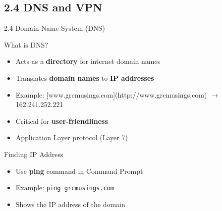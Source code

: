 \documentclass{beamer}
\begin{document}
	\subsection{2.4 DNS and VPN}
	\begin{frame}{2.4 Domain Name System (DNS)}
		\begin{block}{What is DNS?}
			\begin{itemize}
				\item Acts as a \textbf{directory} for internet domain names
				\item Translates \textbf{domain names} to \textbf{IP addresses}
				\item Example: [www.grcmusings.com](http://www.grcmusings.com) $\to$ 162.241.252.221
				\item Critical for \textbf{user-friendliness}
				\item Application Layer protocol (Layer 7)
			\end{itemize}
		\end{block}
		
		\begin{block}{Finding IP Address}
			\begin{itemize}
				\item Use \textbf{ping} command in Command Prompt
				\item Example: \texttt{ping grcmusings.com}
				\item Shows the IP address of the domain
			\end{itemize}
		\end{block}
	\end{frame}
	
\end{document}
